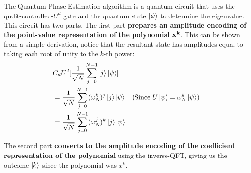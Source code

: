 \documentclass[prb,preprint]{revtex4}
\begin{document}
	The Quantum Phase Estimation algorithm is a quantum circuit that uses the qudit-controlled-$U^d$ gate and the quantum state $\ket{\psi}$ to determine the eigenvalue. 
	This circuit has two parts. The first part \textbf{prepares an amplitude encoding of the point-value representation of the polynomial} $\bf{x^k}$. This can be shown from a simple derivation, notice that the resultant state has amplitudes equal to taking each root of unity to the $k$-th power: 
	\begin{eqnarray}
		&C_dU^d [\frac{1}{\sqrt{N}}\sum_{j=0}^{N-1} \ket{j}\ket{\psi}] \nonumber \\
		&=\frac{1}{\sqrt{N}}\sum_{j=0}^{N-1}  (\omega^{k}_N)^j \ket{j} \ket{\psi}  &(\text{Since } U\ket{\psi} = \omega_N^k \ket{\psi}) \nonumber \\
		&=\frac{1}{\sqrt{N}}\sum_{j=0}^{N-1}  (\omega^{j}_N)^k \ket{j} \ket{\psi} 
	\end{eqnarray}
	
	The second part \textbf{converts to the amplitude encoding of the coefficient representation of the polynomial} using the inverse-QFT, giving us the outcome $\ket{k}$ since the polynomial was $x^k$. 
	
	
	 
	
	
	
	
\end{document}
